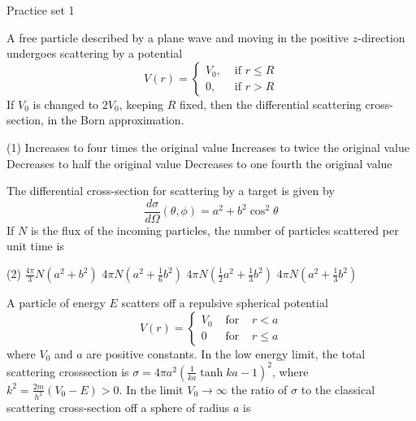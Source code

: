  \newpage
 \begin{abox}
 	Practice set 1
 	\end{abox}
 \begin{enumerate}
 	\begin{minipage}{\textwidth}
 	\item A free particle described by a plane wave and moving in the positive $z$-direction undergoes scattering by a potential
 	$$
 	V(r)= \begin{cases}V_{0}, & \text { if } r \leq R \\ 0, & \text { if } r>R\end{cases}
 	$$
 	If $V_{0}$ is changed to $2 V_{0}$, keeping $R$ fixed, then the differential scattering cross-section, in the Born approximation.
 \end{minipage}
 \begin{tasks}(1)
 	\task[\textbf{A.}]Increases to four times the original value
 	\task[\textbf{B.}]Increases to twice the original value
 	\task[\textbf{C.}]Decreases to half the original value
 	\task[\textbf{D.}]Decreases to one fourth the original value
 \end{tasks}
\begin{minipage}{\textwidth}
	\item The differential cross-section for scattering by a target is given by
	$$
	\frac{d \sigma}{d \Omega}(\theta, \phi)=a^{2}+b^{2} \cos ^{2} \theta
	$$
	If $N$ is the flux of the incoming particles, the number of particles scattered per unit time is
\end{minipage}
\begin{tasks}(2)
	\task[\textbf{A.}] $\frac{4 \pi}{3} N\left(a^{2}+b^{2}\right)$
	\task[\textbf{B.}]$4 \pi N\left(a^{2}+\frac{1}{6} b^{2}\right)$
	\task[\textbf{C.}]$4 \pi N\left(\frac{1}{2} a^{2}+\frac{1}{3} b^{2}\right)$
	\task[\textbf{D.}]$4 \pi N\left(a^{2}+\frac{1}{3} b^{2}\right)$
\end{tasks}
\begin{minipage}{\textwidth}
	\item A particle of energy $E$ scatters off a repulsive spherical potential
	$$
	V(r)=\left\{\begin{array}{ccc}
	V_{0} & \text { for } & r<a \\
	0 & \text { for } & r \leq a
	\end{array}\right.
	$$
	where $V_{0}$ and $a$ are positive constants. In the low energy limit, the total scattering crosssection is $\sigma=4 \pi a^{2}\left(\frac{1}{k a} \tanh k a-1\right)^{2}$, where $k^{2}=\frac{2 m}{h^{2}}\left(V_{0}-E\right)>0$. In the limit $V_{0} \rightarrow \infty$ the ratio of $\sigma$ to the classical scattering cross-section off a sphere of radius $a$ is

\end{minipage}
\end{enumerate}

